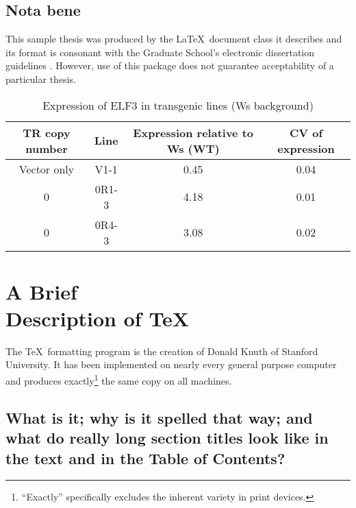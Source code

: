 \documentclass [11pt, twoside] {uwthesis}[2012/06/19]
\begin{document}
 
\section{Nota bene}
 
This sample thesis was produced by the \LaTeX\ document class it describes
and its format is consonant with the Graduate School's electronic dissertation guidelines%
\cite{SP}.
However, use of this package does not guarantee acceptability
of a particular thesis.

 
\begin{longtable}{|c|c|c|c|}
\caption{Expression of ELF3 in transgenic lines (Ws background)} \\

\hline

TR copy number & Line  & Expression relative to Ws (WT) & CV of expression \\
\hline 
Vector only & V1-1 & 0.45 & 0.04 \\
0 & 0R1-3 & 4.18 & 0.01 \\
0 & 0R4-3 & 3.08 & 0.02 \\
\end{longtable}
 
 
 
\chapter{A Brief \\ Description of \protect\TeX}
 
The \TeX\ formatting program is the creation of
Donald Knuth of Stanford University.
It has been implemented on nearly every general purpose computer and
produces exactly\footnote{``Exactly'' specifically excludes the
  inherent variety in print devices.}
the same copy on all machines.
 
\section{What is it; why is it spelled that way; 
and what do
really long section titles look like in the text and in the
Table of Contents?}
 
\end{document}

